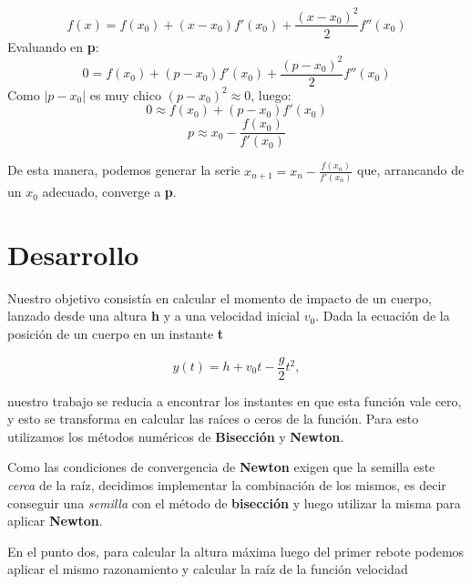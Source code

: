 \documentclass[a4paper]{article}
\begin{document}
$$f(x) = f(x_0) + (x - x_0)f'(x_0) + \frac{(x - x_0)^2}{2}f''(x_0)$$
Evaluando en \textbf{p}:
$$0 = f(x_0) + (p - x_0)f'(x_0) + \frac{(p - x_0)^2}{2}f''(x_0)$$
Como  $|p - x_0|$ es muy chico $(p - x_0)^2 \approx 0$, luego:  
$$0 \approx f(x_0) + (p - x_0)f'(x_0)$$
$$p \approx x_0 - \frac{f(x_0)}{f'(x_0)}$$

De esta manera, podemos generar la serie $x_{n + 1} = x_n - \frac{f(x_n)}{f'(x_n)}$ que, arrancando de un $x_0$ adecuado, converge a \textbf{p}.

\newpage

\section{Desarrollo}

Nuestro objetivo consistía en calcular el momento de impacto de un cuerpo, lanzado desde una altura \textbf{h} y a una velocidad inicial \textbf{$v_0$}. Dada la ecuación de la posición de un cuerpo en un instante \textbf{t}

\begin{equation}
 y(t) = h + v_0 t - \frac{g}{2} t^2,
\end{equation}

nuestro trabajo se reducia a encontrar los instantes en que esta función vale cero, y esto se transforma en calcular las raíces o ceros de la función. Para esto utilizamos los métodos numéricos de \textbf{Bisección} y \textbf{Newton}.

Como las condiciones de convergencia de \textbf{Newton} exigen que la semilla este \textit{cerca} de la raíz, decidimos implementar la combinación de los mismos, es decir conseguir una \textit{semilla} con el método de \textbf{bisección} y luego utilizar la misma para aplicar \textbf{Newton}. \\ \hspace{1em}

En el punto dos, para calcular la altura máxima luego del primer rebote podemos aplicar el mismo razonamiento y calcular la raíz de la función velocidad
\end{document}

